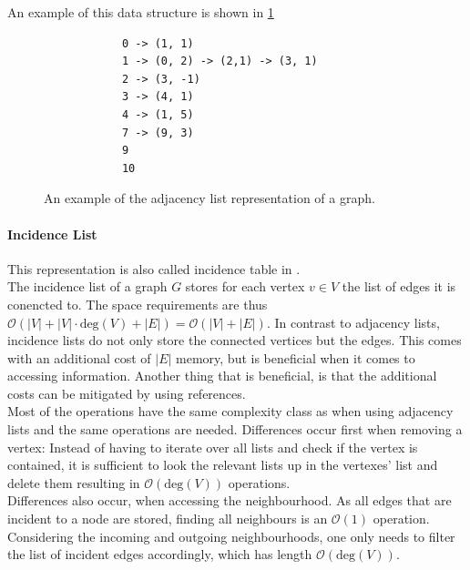         An example of this data structure is shown in \ref{adjl}
        
        \begin{figure}[htp]
         \begin{center}
          \begin{verbatim}
            0 -> (1, 1)
            1 -> (0, 2) -> (2,1) -> (3, 1)
            2 -> (3, -1)
            3 -> (4, 1)
            4 -> (1, 5)
            7 -> (9, 3)
            9
            10
          \end{verbatim}
         \end{center}
         \caption{An example of the adjacency list representation of a graph.}
         \label{adjl}
        \end{figure}
        
        \paragraph{Incidence List}
        This representation is also called incidence table in \autocite{Gross1998GraphTA}. \\
        The incidence list of a graph $G$ stores for each vertex $v \in V$ the list of edges it is conencted to. 
        The space requirements are thus $\mathcal{O}(|V| + |V| \cdot \text{deg}(V) + |E|) = \mathcal{O}(|V| + |E|)$. 
        In contrast to adjacency lists, incidence lists do not only store the connected vertices but the edges. 
        This comes with an additional cost of $|E|$ memory, but is beneficial when it comes to accessing information. Another thing that is beneficial, is that the additional costs can be mitigated by using references. \\
        
        Most of the operations have the same complexity class as when using adjacency lists and the same operations are needed. 
        Differences occur first when removing a vertex:
        Instead of having to iterate over all lists and check if the vertex is contained, it is sufficient to look the relevant lists up in the vertexes' list and delete them resulting in $\mathcal{O}(\text{deg}(V))$ operations. \\
        
        Differences also occur, when accessing the neighbourhood. 
        As all edges that are incident to a node are stored, finding all neighbours is an $\mathcal{O}(1)$ operation. 
        Considering the incoming and outgoing neighbourhoods, one only needs to filter the list of incident edges accordingly, which has length $\mathcal{O}(\text{deg}(V))$.\\
        

